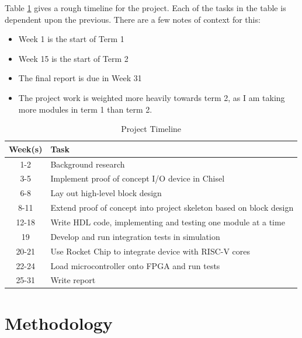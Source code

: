 \documentclass[a4paper,fleqn,12pt]{article}
\begin{document}
Table \ref{tab:timeline} gives a rough timeline for the project. Each of the tasks in the table is dependent upon the previous. There are a few notes of context for this:

\begin{itemize}
    \item Week 1 is the start of Term 1
    \item Week 15 is the start of Term 2
    \item The final report is due in Week 31
    \item The project work is weighted more heavily towards term 2, as I am taking more modules in term 1 than term 2.
\end{itemize}


\begin{table}[ht!]
    \centering
    \begin{tabular}{|c|l|}
        \hline
        \textbf{Week(s)} & \textbf{Task}                                                       \\ \hline
        1-2              & Background research                                                 \\ \hline
        3-5              & Implement proof of concept I/O device in Chisel                     \\ \hline
        6-8              & Lay out high-level block design                                     \\ \hline
        8-11             & Extend proof of concept into project skeleton based on block design \\ \hline
        12-18            & Write HDL code, implementing and testing one module at a time       \\ \hline
        19               & Develop and run integration tests in simulation                     \\ \hline
        20-21            & Use Rocket Chip to integrate device with RISC-V cores               \\ \hline
        22-24            & Load microcontroller onto FPGA and run tests                        \\ \hline
        25-31            & Write report                                                        \\ \hline
    \end{tabular}
    \caption{Project Timeline}
    \label{tab:timeline}
\end{table}

\section{Methodology}
\end{document}
